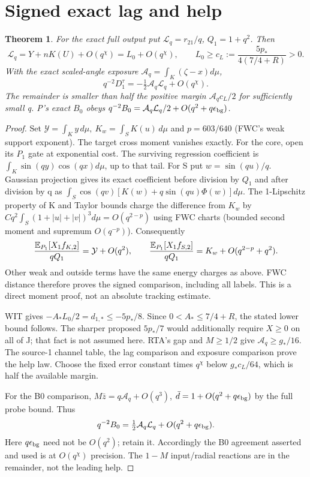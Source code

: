 \documentclass[11pt]{article}
\newtheorem{theorem}{Theorem}\newtheorem{lemma}{Lemma}
\begin{document}
\section{Signed exact lag and help}\label{an01cpdv1:lag}
\begin{theorem}\label{an01cpdv1:help}
For the exact full output put
\(\mathcal L_q=r_{21}/q\), \(Q_1=1+q^2\). Then
\[
\mathcal L_q=Y+nK(U)+O(q^\chi)=L_0+O(q^\chi),\qquad
L_0\ge c_L:=\frac{5p_*}{4(7/4+R)}>0.
\]
With the exact scaled-angle exposure
\(\mathcal A_q=\int_K(\zeta-x)d\mu\),
\[
q^{-2}D_1^\tau=-\tfrac12\mathcal A_q\mathcal L_q+O(q^\chi).
\]
The remainder is smaller than half the positive margin
\(\mathcal A_qc_L/2\) for sufficiently small q.
P's exact \(B_0\) obeys
\(q^{-2}B_0=\mathcal A_q\mathcal L_q/2+O(q^2+q\epsilon_{\rm bg})\).
\end{theorem}
\begin{proof}
Set \(\mathcal Y=\int_Ky\,d\mu,\ K_w=\int_SK(u)\,d\mu\) and
\(p=603/640\) (FWC's weak support exponent).
The target cross moment vanishes exactly. For the core, open its
\(P_1\) gate at exponential cost. The surviving regression coefficient
is \(\int_K\sin(qy)\cos(qx)d\mu\), up to that tail.
For S put \(w=\sin(qu)/q\). Gaussian projection gives its exact
coefficient before division by \(Q_1\) and after division by q as
\(\int_S\cos(qv)[K(w)+q\sin(qu)\Phi(w)]d\mu\).
The 1-Lipschitz property of K and Taylor bounds charge the difference
from \(K_w\) by \(Cq^2\int_S(1+|u|+|v|)^3d\mu=O(q^{2-p})\)
using FWC charts (bounded second moment and supremum \(O(q^{-p})\)).
Consequently
\[
\frac{\mathbb E_{P_1}[X_1 f_{K,2}]}{qQ_1}=\mathcal Y+O(q^2),\qquad
\frac{\mathbb E_{P_1}[X_1 f_{S,2}]}{qQ_1}=K_w+O(q^{2-p}+q^2).
\]
Other weak and outside terms have the same energy charges as above.
FWC distance therefore proves the signed comparison, including all labels.
This is a direct moment proof, not an absolute tracking estimate.

WIT gives \(-A_*L_0/2=d_{1,*}\le-5p_*/8\).
Since \(0<A_*\le7/4+R\), the stated lower bound follows.
The sharper proposed \(5p_*/7\) would additionally require \(X\ge0\)
on all of J; that fact is not assumed here.
RTA's gap and \(M\ge1/2\) give \(\mathcal A_q\ge g_*/16\).
The source-1 channel table, the lag comparison and exposure comparison
prove the help law. Choose the fixed error constant times \(q^\chi\)
below \(g_*c_L/64\), which is half the available margin.

For the B0 comparison,
\(M\bar z=q\mathcal A_q+O(q^3)\), \(\bar d=1+O(q^2+q\epsilon_{\rm bg})\) by the full probe bound. Thus
\[
q^{-2}B_0=\tfrac12\mathcal A_q\mathcal L_q
 +O(q^2+q\epsilon_{\rm bg}).
\]
Here \(q\epsilon_{\rm bg}\) need not be \(O(q^2)\); retain it.
Accordingly the B0 agreement asserted and used is at \(O(q^\chi)\)
precision. The \(1-M\) input/radial reactions are in the remainder,
not the leading help.
\end{proof}
\end{document}
